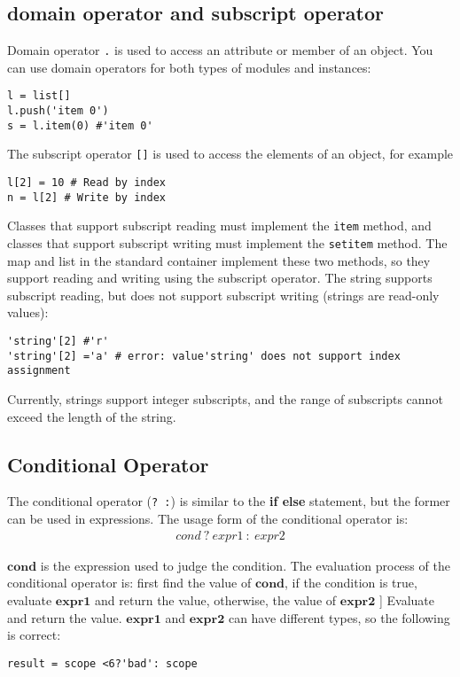 \subsection {domain operator and subscript operator}

Domain operator \texttt{.} is used to access an attribute or member of an object. You can use domain operators for both types of modules and instances:
\begin{lstlisting}[language=berry, numbers=none]
l = list[]
l.push('item 0')
s = l.item(0) #'item 0'
\end{lstlisting}

The subscript operator \texttt{[]} is used to access the elements of an object, for example
\begin{lstlisting}[language=berry, numbers=none]
l[2] = 10 # Read by index
n = l[2] # Write by index
\end{lstlisting}

Classes that support subscript reading must implement the \texttt{item} method, and classes that support subscript writing must implement the \texttt{setitem} method. The map and list in the standard container implement these two methods, so they support reading and writing using the subscript operator. The string supports subscript reading, but does not support subscript writing (strings are read-only values):
\begin{lstlisting}[language=berry, numbers=none]
'string'[2] #'r'
'string'[2] ='a' # error: value'string' does not support index assignment
\end{lstlisting}

Currently, strings support integer subscripts, and the range of subscripts cannot exceed the length of the string.

\subsection {Conditional Operator}The conditional operator (\texttt{? :}) is similar to the \textbf{if else} statement, but the former can be used in expressions. The usage form of the conditional operator is: \vspace{-0.5em}
\begin{gather*}
    cond\ \bm{?}\ expr1\ \bm{:}\ expr2
\end{gather*}

$\bm{cond}$ is the expression used to judge the condition. The evaluation process of the conditional operator is: first find the value of $\bm{cond}$, if the condition is true, evaluate $\bm{expr1}$ and return the value, otherwise, the value of $\bm{expr2}$ ] Evaluate and return the value. $\bm{expr1}$ and $\bm{expr2}$ can have different types, so the following is correct:
\begin{lstlisting}[language=berry, numbers=none]
result = scope <6?'bad': scope
\end{lstlisting}


